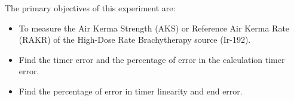 The primary objectives of this experiment are:
\begin{itemize}
    \item To measure the Air Kerma Strength (AKS) or Reference Air Kerma Rate (RAKR) of the High-Dose Rate Brachytherapy source (Ir-192).
    \item Find the timer error and the percentage of error in the calculation timer error.
    \item Find the percentage of error in timer linearity and end error.
\end{itemize}